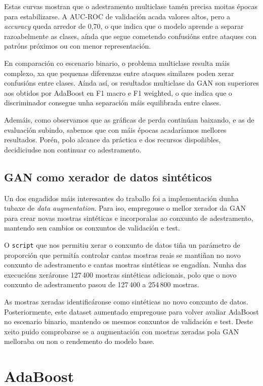 \documentclass[12pt,a4paper]{article}
\begin{document}
Estas curvas mostran que o adestramento multiclase tamén precisa moitas épocas
para estabilizarse. A AUC-ROC de validación acada valores altos, pero a
\emph{accuracy} queda arredor de 0,70, o que indica que o modelo aprende a
separar razoabelmente as clases, aínda que segue cometendo confusións entre
ataques con patróns próximos ou con menor representación.

En comparación co escenario binario, o problema multiclase resulta máis
complexo, xa que pequenas diferenzas entre ataques similares poden xerar
confusións entre clases. Aínda así, os resultados multiclase da GAN son
superiores aos obtidos por AdaBoost en F1 macro e F1 weighted, o que indica
que o discriminador consegue unha separación máis equilibrada entre clases.

Ademáis, como observamos que as gráficas de perda continúan baixando, e as de evaluación subindo, sabemos que con máis épocas acadaríamos mellores resultados. Porén, polo alcance da práctica e dos
recursos dispoñibles, decidiciudse non continuar co adestramento.

\subsection{GAN como xerador de datos sintéticos}

Un dos engadidos máis interesantes do traballo foi a implementación dunha
tubaxe de \emph{data augmentation}. Para iso, empregouse o mellor xerador
da GAN para crear novas mostras sintéticas e incorporalas ao conxunto de
adestramento, mantendo sen cambios os conxuntos de validación e test.

O \texttt{script} que nos permitiu xerar o conxunto de datos tiña un parámetro de proporción que permitía controlar cantas mostras reais se mantiñan
no novo conxunto de adestramento e cantas mostras sintéticas se engadían.
Nunha das execucións xeráronse 127\,400 mostras sintéticas
adicionais, polo que o novo conxunto de adestramento pasou de 127\,400 a
254\,800 mostras.

As mostras xeradas identificáronse como sintéticas no novo conxunto de datos.
Posteriormente, este dataset aumentado empregouse para volver avaliar AdaBoost
no escenario binario, mantendo os mesmos conxuntos de validación e test. Deste
xeito puido comprobarse se a augmentación con mostras xeradas pola GAN melloraba
ou non o rendemento do modelo base.

\section{AdaBoost} \label{sec:AdaBoost}
\end{document}
